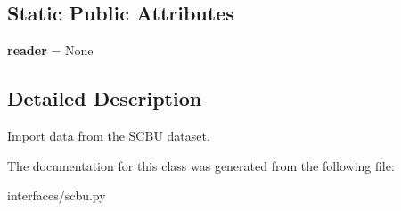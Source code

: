 \subsection*{Static Public Attributes}
\begin{DoxyCompactItemize}
\item 
\hypertarget{classinterfaces_1_1scbu_1_1_s_c_b_u___importer_a7b3c9ec1b884cde729ec0d82801b846b}{{\bfseries reader} = None}\label{classinterfaces_1_1scbu_1_1_s_c_b_u___importer_a7b3c9ec1b884cde729ec0d82801b846b}

\end{DoxyCompactItemize}


\subsection{Detailed Description}
Import data from the S\-C\-B\-U dataset. 

The documentation for this class was generated from the following file\-:\begin{DoxyCompactItemize}
\item 
interfaces/scbu.\-py\end{DoxyCompactItemize}
